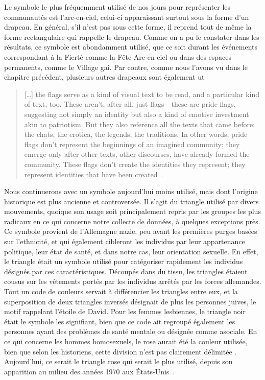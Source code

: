 Le symbole le plus fréquemment utilisé de nos jours pour représenter les communautés \lgbt{} est l'arc-en-ciel, celui-ci apparaissant surtout sous la forme d'un drapeau.
En général, s'il n'est pas sous cette forme, il reprend tout de même la forme rectangulaire qui rappelle le drapeau.
Comme on a pu le constater dans les résultats, ce symbole est abondamment utilisé, que ce soit durant les événements correspondant à la Fierté comme la Fête Arc-en-ciel ou dans des espaces permanents, comme le Village gai.
Par contre, comme nous l'avons vu dans le chapitre précédent, plusieurs autres drapeaux sont également ut
\blockquote{[\ldots] the flags serve as a kind of visual text to be read, and a particular kind of text, too. 
These aren’t, after all, just flags—these are pride flags, suggesting not simply an identity but also a kind of emotive investment akin to patriotism.  
But they also reference all the texts that came before: the chats, the erotica, the legends, the traditions. 
In other words, pride flags don’t represent the beginnings of an imagined community; they emerge only after other texts, other discourses, have already formed the community.  
These flags don’t create the identities they represent; they represent identities that have been created~\citep[350]{Barrios2004}.}

Nous continuerons avec un symbole aujourd'hui moins utilisé, mais dont l'origine historique est plus ancienne et controversée.
Il s'agit du triangle utilisé par divers mouvements, quoique son usage soit principalement repris par les groupes les plus radicaux en ce qui concerne notre collecte de données, à quelques exceptions près.
Ce symbole provient de l'Allemagne nazie, peu avant les premières purges basées sur l'ethnicité, et qui également cibleront les individus par leur appartenance politique, leur état de santé, et dans notre cas, leur orientation sexuelle.
En effet, le triangle était un symbole utilisé pour catégoriser rapidement les individus désignés par ces caractéristiques.
Découpés dans du tissu, les triangles étaient cousus sur les vêtements portés par les individus arrêtés par les forces allemandes.
Tout un code de couleurs servait à différencier les triangles entre eux, et la superposition de deux triangles inversés désignait de plus les personnes juives, le motif rappelant l'étoile de David.
Pour les femmes lesbiennes, le triangle noir était le symbole les signifiant, bien que ce code ait regroupé également les personnes ayant des problèmes de santé mentale ou désignée comme asociale.
En ce qui concerne les hommes homosexuels, le rose aurait été la couleur utilisée, bien que selon les historiens, cette division n'est pas clairement délimitée \citep[334]{Jensen2002}.
Aujourd'hui, ce serait le triangle rose qui serait le plus utilisé, depuis son apparition au milieu des années 1970 aux États-Unis~\citep[328]{Jensen2002}.

